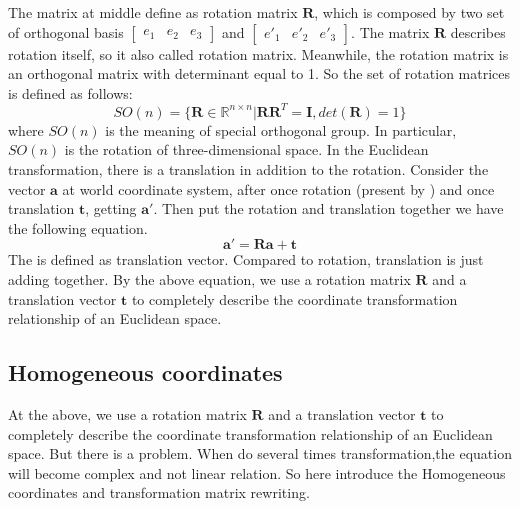 The matrix at middle define as rotation matrix $\pmb{R}$, which is composed by two set of orthogonal basis 
$
\begin{bmatrix}
    e_1 & e_2 & e_3 
\end{bmatrix} 
$ and 
$ 
\begin{bmatrix}
    e'_1 & e'_2 & e'_3 
\end{bmatrix}. 
$
The matrix $\pmb{R}$ describes rotation itself, so it also called rotation matrix. Meanwhile, the rotation matrix is an orthogonal matrix with determinant equal to 1. So the set of rotation matrices is defined as follows:
\begin{equation}
    SO(n)=\{\pmb{R} \in \mathbb{R}^{n\times n} | \pmb{R}\pmb{R}^T = \pmb{I}, det(\pmb{R}) = 1\}
\end{equation}
where $SO(n)$ is the meaning of special orthogonal group. In particular, $SO(n)$ is the rotation of three-dimensional space. In the Euclidean transformation, there is a translation in addition to the rotation.
Consider the vector $\pmb{a}$ at world coordinate system, after once rotation (present by ) and once translation $\pmb{t}$, getting $\pmb{a}'$. Then put the rotation and translation together we have the following equation.
\begin{equation}
\pmb{a}'=\pmb{Ra} + \pmb{t}
\end{equation}
The  is defined as translation vector. Compared to rotation, translation is just adding together. By the above equation, we use a rotation matrix $\pmb{R}$ and a translation vector $\pmb{t}$ to completely describe the coordinate transformation relationship of an Euclidean space.

\subsection{Homogeneous coordinates}

At the above, we use a rotation matrix $\pmb{R}$ and a translation vector $\pmb{t}$ to completely describe the coordinate transformation relationship of an Euclidean space.
But there is a problem. When do several times transformation,the equation will become complex and not linear relation. So here introduce the Homogeneous coordinates and transformation matrix rewriting.

